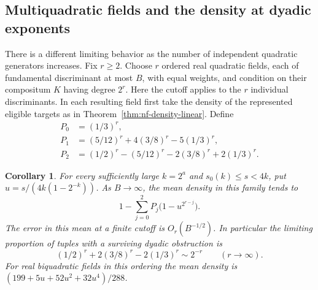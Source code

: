 \documentclass[11pt,letterpaper]{article}
\newtheorem{corollary}[corollary]{Corollary}
\theoremstyle{definition}
\numberwithin{equation}{section}
\begin{document}
\subsection{Multiquadratic fields and the density at dyadic exponents}
\label{sec:multiquadratic-density}
There is a different limiting behavior as the number of independent
quadratic generators increases. Fix $r\ge2$. Choose $r$ ordered real
quadratic fields, each of fundamental discriminant at most $B$, with
equal weights, and condition on their compositum $K$ having degree
$2^r$. Here the cutoff applies to the $r$ individual discriminants.
In each resulting field first take the density of the represented
eligible targets as in Theorem~\ref{thm:nf-density-linear}.
Define
\begin{align*}
 P_0&=(1/3)^r,\\
 P_1&=(5/12)^r+4(3/8)^r-5(1/3)^r,\\
 P_2&=(1/2)^r-(5/12)^r-2(3/8)^r+2(1/3)^r .
\end{align*}
\begin{corollary}\label{cor:multiquadratic-density}
For every sufficiently large $k=2^a$ and $s_0(k)\le s<4k$, put
$u=s/(4k(1-2^{-k}))$. As $B\to\infty$, the mean density in this
family tends to
\[
  1-\sum_{j=0}^2 P_j\bigl(1-u^{2^{r-j}}\bigr).
\]
The error in this mean at a finite cutoff is $O_r(B^{-1/2})$.
In particular the limiting proportion of tuples with a surviving
dyadic obstruction is
\[
   (1/2)^r+2(3/8)^r-2(1/3)^r\sim2^{-r}
                              \qquad(r\to\infty).
\]
For real biquadratic fields in this ordering the mean density is
$(199+5u+52u^2+32u^4)/288$.
\end{corollary}
\end{document}
